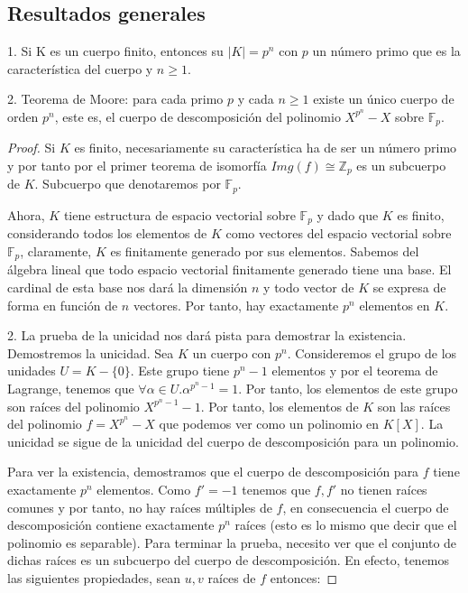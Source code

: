 \subsection{Resultados generales}

\begin{theorem}
1. Si K es un cuerpo finito, entonces su $|K| = p^n$ con $p$ un número primo que es la característica del cuerpo y $n \ge 1$. 

2. Teorema de Moore: para cada primo $p$ y cada $n \ge 1$ existe un único cuerpo de orden $p^n$, este es, el cuerpo de descomposición del polinomio $X^{p^n} - X$ sobre $\mathbb{F}_p$. 
\end{theorem}
\begin{proof}
Si $K$ es finito, necesariamente su característica ha de ser un número primo y por tanto por el primer teorema de isomorfía $Img(f) \cong \mathbb{Z}_p$ es un subcuerpo de $K$. Subcuerpo que denotaremos por $\mathbb{F}_p$.

Ahora, $K$ tiene estructura de espacio vectorial sobre $\mathbb{F}_p$ y dado que $K$ es finito, considerando todos los elementos de $K$ como vectores del espacio vectorial sobre $\mathbb{F}_p$, claramente, $K$ es finitamente generado por sus elementos. Sabemos del álgebra lineal que todo espacio vectorial finitamente generado tiene una base. El cardinal de esta base nos dará la dimensión $n$ y todo vector de $K$ se expresa de forma en función de $n$ vectores. Por tanto, hay exactamente $p^n$ elementos en $K$. 

2. La prueba de la unicidad nos dará pista para demostrar la existencia. Demostremos la unicidad. Sea $K$ un cuerpo con $p^n$. Consideremos el grupo de los unidades $U = K-\{0\}$. Este grupo tiene $p^n - 1$ elementos y por el teorema de Lagrange, tenemos que $\forall \alpha \in U. \alpha^{p^n - 1} = 1$. Por tanto, los elementos de este grupo son raíces del polinomio $X^{p^n-1}-1$. Por tanto, los elementos de $K$ son las raíces del polinomio $f = X^{p^n}-X$ que podemos ver como un polinomio en $K[X]$. La unicidad se sigue de la unicidad del cuerpo de descomposición para un polinomio.

Para ver la existencia, demostramos que el cuerpo de descomposición para $f$ tiene exactamente $p^n$ elementos. Como $f' = -1$ tenemos que $f,f'$ no tienen raíces comunes y por tanto, no hay raíces múltiples de $f$, en consecuencia el cuerpo de descomposición contiene exactamente $p^n$ raíces (esto es lo mismo que decir que el polinomio es separable). Para terminar la prueba, necesito ver que el conjunto de dichas raíces es un subcuerpo del cuerpo de descomposición. En efecto, tenemos las siguientes propiedades, sean $u,v$ raíces de $f$ entonces:


\end{proof}
